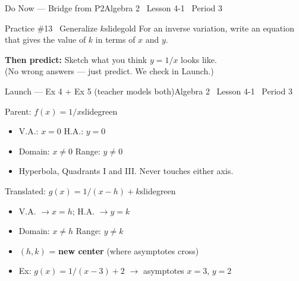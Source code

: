 \documentclass[aspectratio=169, 14pt]{beamer}
\begin{document}

\begin{frame}{Do Now --- Bridge from P2}{Algebra 2 \textperiodcentered\ Lesson 4-1 \textperiodcentered\ Period 3}
\vspace{0.2cm}
\begin{projcard}{Practice \#13 \textperiodcentered\ Generalize \(k\)}{slidegold}
For an inverse variation, write an equation that gives the value of \(k\) in terms of \(x\) and \(y\).

\vspace{0.25cm}
\textbf{Then predict:} Sketch what you think \(y = 1/x\) looks like.\\
\small (No wrong answers --- just predict. We check in Launch.)
\end{projcard}
\end{frame}

\begin{frame}{Launch --- Ex 4 + Ex 5 (teacher models both)}{Algebra 2 \textperiodcentered\ Lesson 4-1 \textperiodcentered\ Period 3}
\vspace{0.1cm}
\begin{projcard}{Parent: \(f(x) = 1/x\)}{slidegreen}
\begin{itemize}
  \setlength{\itemsep}{0pt}
  \item V.A.: \(x = 0\) \quad H.A.: \(y = 0\)
  \item Domain: \(x \neq 0\) \quad Range: \(y \neq 0\)
  \item Hyperbola, Quadrants I and III. Never touches either axis.
\end{itemize}
\end{projcard}
\vspace{-0.2cm}
\begin{projcard}{Translated: \(g(x) = 1/(x-h) + k\)}{slidegreen}
\begin{itemize}
  \setlength{\itemsep}{0pt}
  \item V.A. \(\rightarrow x = h\); H.A. \(\rightarrow y = k\)
  \item Domain: \(x \neq h\) \quad Range: \(y \neq k\)
  \item \((h, k)\) = \textbf{new center} (where asymptotes cross)
  \item \textcolor{slideaccent}{Ex: \(g(x) = 1/(x-3)+2\) \(\rightarrow\) asymptotes \(x=3\), \(y=2\)}
\end{itemize}
\end{projcard}
\end{frame}
\end{document}
